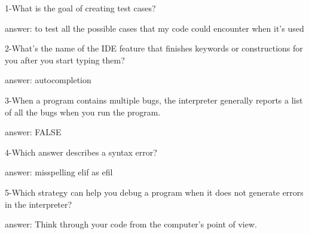 1-What is the goal of creating test cases?

answer: to test all the possible cases that my code could encounter when it's used

2-What's the name of the IDE feature that finishes keywords or constructions for you after you start typing them?

answer: autocompletion

3-When a program contains multiple bugs, the interpreter generally reports a list of all the bugs when you run the program.

answer: FALSE

4-Which answer describes a syntax error?

answer: misspelling elif as efil

5-Which strategy can help you debug a program when it does not generate errors in the interpreter?

answer: Think through your code from the computer's point of view.
